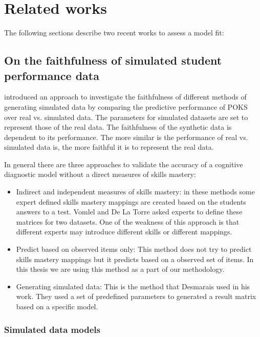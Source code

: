 \section{Related works}

The following sections describe two recent works \citep{Desmarais2010,Rosenberg2015} to assess a model fit:


\subsection{On the faithfulness of simulated student performance data}

\citet{Desmarais2010} introduced an approach to investigate the faithfulness of different methods of generating simulated data by comparing the predictive performance of POKS over real vs. simulated data. The parameters for simulated datasets are set to represent those of the real data. The faithfulness of the synthetic data is dependent to its performance. The more similar is the performance of real vs. simulated data is, the more faithful it is to represent the real data.

In general there are three approaches to validate the accuracy of a cognitive diagnostic model without a direct measures of skills mastery:

\begin{itemize}
\item Indirect and independent measures of skills mastery: in these methods some expert defined skills mastery mappings are created based on the students answers to a test. Vomlel \citep{vomlel:2004} and De La Torre \citep{delaTorre2008} asked experts to define these matrices for two datasets. One of the weakness of this approach is that different experts may introduce different skills or different mappings.

\item Predict based on observed items only: This method does not try to predict skills mastery mappings but it predicts based on a observed set of items. In this thesis we are using this method as a part of our methodology.

\item Generating simulated data: This is the method that Desmarais \citep{Desmarais2010} used in his work. They used a set of predefined parameters to generated a result matrix based on a specific model.

\end{itemize}
\subsubsection{Simulated data models}

